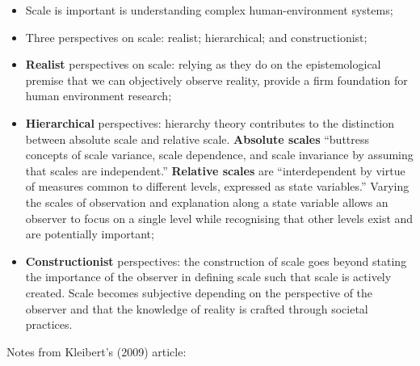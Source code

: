 \documentclass[a4paper, 10.5pt]{article} %
\begin{document}
\begin{itemize}
  \item Scale is important is understanding complex human-environment systems;
  \item Three perspectives on scale: realist; hierarchical; and constructionist;
  \item \textbf{Realist} perspectives on scale: relying as they do on the epistemological premise that we can objectively observe reality, provide a firm foundation for human environment research;
  \item \textbf{Hierarchical} perspectives: hierarchy theory contributes to the distinction between absolute scale and relative scale. \textbf{Absolute scales} \enquote{buttress concepts of scale variance, scale dependence, and scale invariance by assuming that scales are independent.} \textbf{Relative scales} are \enquote{interdependent by virtue of measures common to different levels, expressed as state variables.} Varying the scales of observation and explanation along a state variable allows an observer to focus on a single level while recognising that other levels exist and are potentially important;
  \item \textbf{Constructionist} perspectives: the construction of scale goes beyond stating the importance of the observer in defining scale such that scale is actively created. Scale becomes subjective depending on the perspective of the observer and that the knowledge of reality is crafted through societal practices.
\end{itemize}

\vspace{10pt}

Notes from Kleibert's (2009) article:
\end{document}
